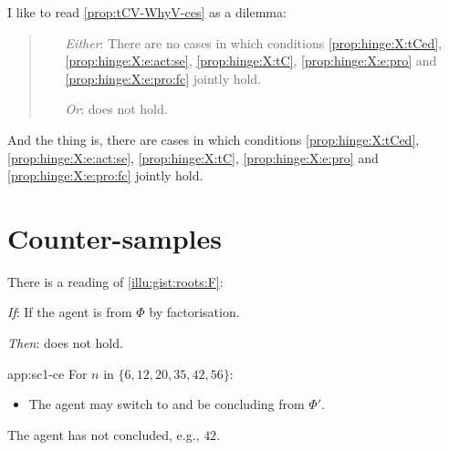 \begin{note}
  I like to read \autoref{prop:tCV-WhyV-ces} as a dilemma:

  \begin{quote}
    \begin{itemize}[labelwidth = ]
    \item[\emph{Either}:]
      There are no cases in which conditions \ref{prop:hinge:X:tCed}, \ref{prop:hinge:X:e:act:se}, \ref{prop:hinge:X:tC}, \ref{prop:hinge:X:e:pro} and \ref{prop:hinge:X:e:pro:fc} jointly hold.
    \item[\emph{Or}:]
      \issueInclusion{} does not hold.
    \end{itemize}
  \end{quote}
  And the thing is, there are cases in which conditions \ref{prop:hinge:X:tCed}, \ref{prop:hinge:X:e:act:se}, \ref{prop:hinge:X:tC}, \ref{prop:hinge:X:e:pro} and \ref{prop:hinge:X:e:pro:fc} jointly hold.
\end{note}




\section{Counter-samples}
\label{sec:counter-samples}

\begin{note}
  \begin{application}%
    \label{app:sc1-ce}%
    There is a reading of \autoref{illu:gist:roots:F}:
    \begin{itenum}
    \item[\emph{If}:]
      If the agent is \tCV{}  from \(\Phi\) by factorisation.
    \item[\emph{Then}:]
      \issueInclusion{} does not hold.
    \end{itenum}
  \end{application}

  \begin{dets}{app:sc1-ce}
    For \(n\) in  \(\{6, 12, 20, 35, 42, 56\}\):
    \begin{itemize}
    \item
      The agent may switch to \rootsConEqGen{} and be concluding  from \(\Phi'\).
    \end{itemize}

    The agent has not concluded, e.g., \(42\).
  \end{dets}
\end{note}


